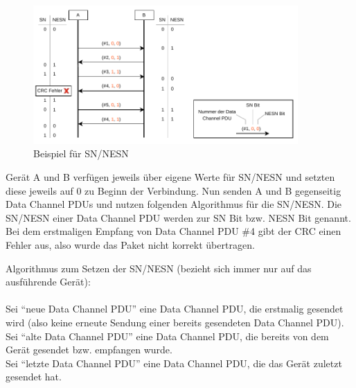 \begin{figure}[H]
    \centering
    \includegraphics[width=0.9\textwidth]{graphics/nesn_sn_bsp.pdf}
    \caption[Beispiel für SN/NESN]{Beispiel für SN/NESN}
    \label{fig: anhang nesn sn}
\end{figure}

Gerät A und B verfügen jeweils über eigene Werte für SN/NESN und setzten diese jeweils auf 0 zu Beginn der Verbindung. Nun senden A und B gegenseitig Data Channel PDUs und nutzen folgenden Algorithmus für die SN/NESN. Die SN/NESN einer Data Channel PDU werden zur SN Bit bzw. NESN Bit genannt. Bei dem erstmaligen Empfang von Data Channel PDU \#4 gibt der CRC einen Fehler aus, also wurde das Paket nicht korrekt übertragen. 

Algorithmus zum Setzen der SN/NESN \cite{BtSpec4.0_2239-2241} (bezieht sich immer nur auf das ausführende Gerät):
\\\\
Sei "`neue Data Channel PDU"' eine Data Channel PDU, die erstmalig gesendet wird (also keine erneute Sendung einer bereits gesendeten Data Channel PDU).\\
Sei "`alte Data Channel PDU"' eine Data Channel PDU, die bereits von dem Gerät gesendet bzw. empfangen wurde.\\
Sei "`letzte Data Channel PDU"' eine Data Channel PDU, die das Gerät zuletzt gesendet hat.

